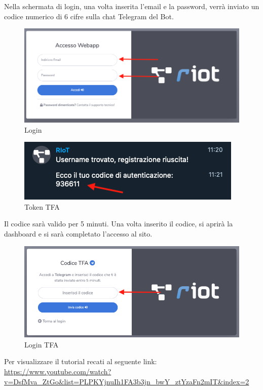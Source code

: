 	Nella schermata di login, una volta inserita l'email e la password, verrà inviato un codice numerico di 6 cifre sulla chat Telegram del Bot. 
	\begin{figure}[H]
		\centering
		\includegraphics[scale=0.600]{res/images/membro/login.png}
		\caption{Login}
	\end{figure}
	\begin{figure}[H]
		\centering
		\includegraphics[scale=0.600]{res/images/membro/tokenTFA.png}
		\caption{Token TFA}
	\end{figure}

	Il codice sarà valido per 5 minuti. Una volta inserito il codice, si aprirà la dashboard e si sarà completato l'accesso al sito.
	\begin{figure}[H]
		\centering
		\includegraphics[scale=0.600]{res/images/membro/loginTFA.png}
		\caption{Login TFA}
	\end{figure}



	Per visualizzare il tutorial recati al seguente link: 
	\url{https://www.youtube.com/watch?v=DsfMva_ZtGo&list=PLPKYjnuIh1FA3b3jn_bwY_ztYzaFn2mIT&index=2}

